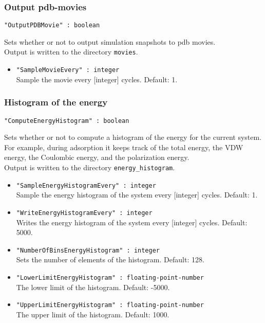 \subsubsection{Output pdb-movies}
\begin{framed}
\verb+"OutputPDBMovie" : boolean+
\end{framed}
Sets whether or not to output simulation snapshots to pdb movies.\\
Output is written to the directory \verb+movies+.
\begin{itemize}
\item{\verb+"SampleMovieEvery" : integer+}\\
Sample the movie every [integer] cycles. Default: 1.
\end{itemize}

\subsubsection{Histogram of the energy}
\begin{framed}
\verb+"ComputeEnergyHistogram" : boolean+
\end{framed}
Sets whether or not to compute a histogram of the energy for the current system.
For example, during adsorption it keeps track of the total energy, the VDW energy,
the Coulombic energy, and the polarization energy.\\
Output is written to  the directory \verb+energy_histogram+.
\begin{itemize}
\item{\verb+"SampleEnergyHistogramEvery" : integer+}\\
Sample the energy histogram of the system every [integer] cycles. Default: 1.
\item{\verb+"WriteEnergyHistogramEvery" : integer+}\\
Writes the energy histogram of the system every [integer] cycles. Default: 5000.
\item{\verb+"NumberOfBinsEnergyHistogram" : integer+}\\
Sets the number of elements of the histogram. Default: 128.
\item{\verb+"LowerLimitEnergyHistogram" : floating-point-number+}\\
The lower limit of the histogram. Default: -5000.
\item{\verb+"UpperLimitEnergyHistogram" : floating-point-number+}\\
The upper limit of the histogram. Default: 1000.
\end{itemize}

